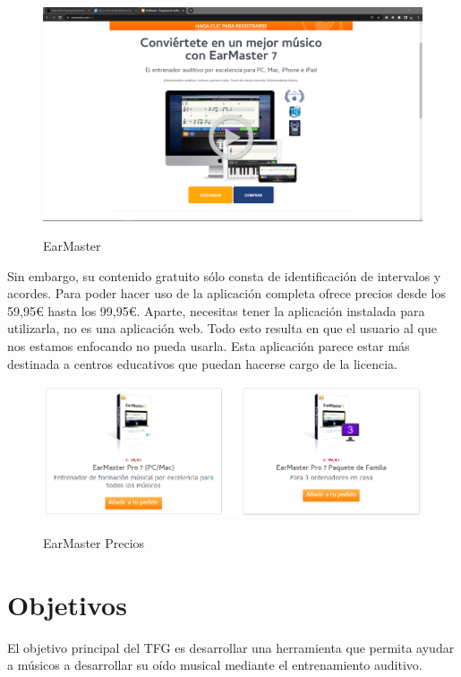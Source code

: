 \documentclass[12pt,twoside,titlepage]{report}
\begin{document}
\begin{figure}[H] 
    \includegraphics[scale=0.25]{Estado del Arte/earmaster}
    \centering
    \label{fig:earmaster}
    \caption{EarMaster}
\end{figure}

Sin embargo, su contenido gratuito sólo consta de identificación de intervalos y acordes. Para poder hacer uso de la aplicación completa ofrece precios desde los 59,95€ hasta los 99,95€. Aparte, necesitas tener la aplicación instalada para utilizarla, no es una aplicación web. Todo esto resulta en que el usuario al que nos estamos enfocando no pueda usarla. Esta aplicación parece estar más destinada a centros educativos que puedan hacerse cargo de la licencia.

\begin{figure}[H] 
    \includegraphics[scale=0.5]{Estado del Arte/earmasterprices}
    \centering
    \label{fig:earmasterprices}
    \caption{EarMaster Precios}
\end{figure}

\section{Objetivos}

El objetivo principal del TFG es desarrollar una herramienta que permita ayudar a músicos a desarrollar su oído musical mediante el entrenamiento auditivo.
\end{document}
